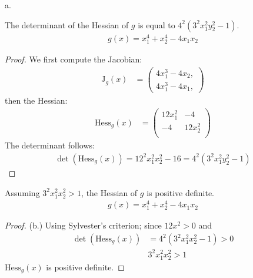 \documentclass[british]{mscs-project}
\begin{document}
\label{problem-3}
a.
\begin{lemma}
 \label{thm:eulers-identity}
 The determinant of the Hessian of $g$ is equal to $4^2(3^2x_1^2y_2^2 - 1)$.
 \begin{align*}
   g(x) = x_1^4 + x_2^4 - 4x_1x_2
 \end{align*}
\end{lemma}
\begin{proof}
We first compute the Jacobian:
\begin{align*}
 \text{J}_g(x) &= \begin{pmatrix}
   4x_1^3 - 4x_2, \\
   4x_1^3 - 4x_1,
 \end{pmatrix}
\end{align*}
 then the Hessian:
\begin{align*}
 \text{Hess}_g(x) &= \begin{pmatrix}
   12x_1^2 & -4 \\
   -4 & 12x_2^2 \\
 \end{pmatrix}
\end{align*}
 The determinant follows:
\begin{align*}
 \det(\text{Hess}_g(x)) = 12^2x_1^2x_2^2 - 16 = 4^2(3^2x_1^2y_2^2 - 1)
\end{align*}
\end{proof}






\begin{lemma}
 \label{lemma:gradient_ineq_bound}
 Assuming $3^2x_1^2x_2^2 > 1$, the Hessian of $g$ is positive definite.
 \begin{align*}
   g(x) = x_1^4 + x_2^4 - 4x_1x_2
 \end{align*}
\end{lemma}
\begin{proof}
(b.) Using Sylvester's criterion; since $12x^2 > 0$ and
\begin{align*}
 \det(\text{Hess}_g(x)) &= 4^2(3^2x_1^2x_2^2 - 1) > 0 \\
     & 3^2x_1^2x_2^2 > 1
\end{align*}
$\text{Hess}_g(x)$ is positive definite.
\end{proof}
\end{document}
